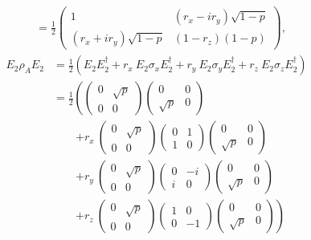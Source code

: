 \documentclass{scrartcl}
\newcommand{\inv}[1]{\frac{1}{#1}}
\DeclareRobustCommand{\[}{\begin{equation}}
\DeclareRobustCommand{\]}{\end{equation}}
\begin{document}
\begin{enumerate}
\begin{enumerate}[a)]
\begin{align}
                &= \inv{2} \begin{pmatrix} 1 & (r_x - i r_y) \sqrt{1 - p} \\ (r_x + i r_y) \sqrt{1 - p} & (1 - r_z)(1 - p) \end{pmatrix},
        \end{align}
        \begin{align}
            E_2 \rho_A E_2 &= \inv{2} \left( E_2 E_2^\dagger + r_x \ E_2 \sigma_x E_2^\dagger + r_y \ E_2 \sigma_y E_2^\dagger + r_z \ E_2 \sigma_z E_2^\dagger \right) \\
                &= \inv{2} \left( \begin{pmatrix} 0 & \sqrt{p} \\ 0 & 0 \end{pmatrix} \begin{pmatrix} 0 & 0 \\ \sqrt{p} & 0 \end{pmatrix} \right. \\
                &\quad \quad \left. + r_x \ \begin{pmatrix} 0 & \sqrt{p} \\ 0 & 0 \end{pmatrix} \begin{pmatrix} 0 & 1 \\ 1 & 0 \end{pmatrix} \begin{pmatrix} 0 & 0 \\ \sqrt{p} & 0 \end{pmatrix} \right. \\
                &\quad \quad \left. + r_y \ \begin{pmatrix} 0 & \sqrt{p} \\ 0 & 0 \end{pmatrix} \begin{pmatrix} 0 & -i \\ i & 0 \end{pmatrix} \begin{pmatrix} 0 & 0 \\ \sqrt{p} & 0 \end{pmatrix} \right. \\
                &\quad \quad \left. + r_z \ \begin{pmatrix} 0 & \sqrt{p} \\ 0 & 0 \end{pmatrix} \begin{pmatrix} 1 & 0 \\ 0 & -1 \end{pmatrix} \begin{pmatrix} 0 & 0 \\ \sqrt{p} & 0 \end{pmatrix} \right) \\

\end{align}
\end{enumerate}
\end{enumerate}
\end{document}

